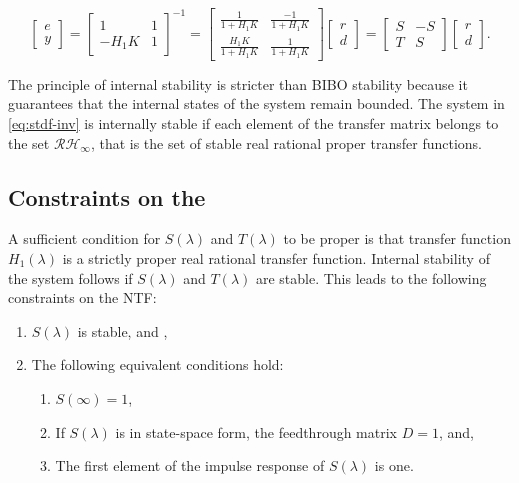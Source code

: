 \begin{equation}
	\begin{bmatrix}
		e \\
		y
	\end{bmatrix} =
	\begin{bmatrix}
		1 & 1 \\
		-H_1K & 1
	\end{bmatrix}^{-1} =
	\begin{bmatrix}
		\frac{1}{1 + H_1K} & \frac{-1}{1 + H_1K} \\
		\frac{H_1K}{1 + H_1K} & \frac{1}{1 + H_1K}
	\end{bmatrix}
	\begin{bmatrix}
		r \\
		d
	\end{bmatrix} = 
	\begin{bmatrix}
		S & -S \\
		T & S
	\end{bmatrix}
	\begin{bmatrix}
		r \\
		d
	\end{bmatrix}. \label{eq:stdf-inv}
\end{equation}

The principle of internal stability is stricter than \gls{BIBO} stability because it guarantees that the internal states of the system remain bounded. The system in \autoref{eq:stdf-inv} is internally stable if each element of the transfer matrix belongs to the set $\mathcal{R}\mathcal{H}_\infty$, that is the set of stable real rational proper transfer functions.

\subsection{Constraints on the }

A sufficient condition for $S(\lambda)$ and $T(\lambda)$ to be proper is that transfer function $H_1(\lambda)$ is a strictly proper real rational transfer function. Internal stability of the system follows if $S(\lambda)$ and $T(\lambda)$ are stable. This leads to the following constraints on the \gls{NTF}:

\begin{enumerate}
	\item $S(\lambda)$ is stable, and \label{it:con-1},
	\item The following equivalent conditions hold: \label{it:con-2}
		\begin{enumerate}
			\item $S(\infty) = 1$,
			\item If $S(\lambda)$ is in state-space form, the feedthrough matrix $D=1$, and,
			\item The first element of the impulse response of $S(\lambda)$ is one.
		\end{enumerate}
\end{enumerate}

